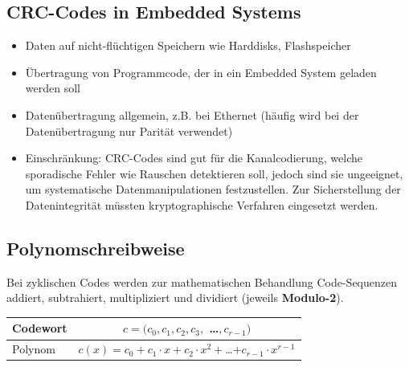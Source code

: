 \subsection{CRC-Codes in Embedded Systems}
\begin{itemize}
	\item Daten auf nicht-flüchtigen Speichern wie Harddisks, Flashspeicher
	\item Übertragung von Programmcode, der in ein Embedded System geladen werden soll
	\item Datenübertragung allgemein, z.B. bei Ethernet (häufig wird bei der Datenübertragung nur Parität verwendet)
	\item Einschränkung: CRC-Codes sind gut für die Kanalcodierung, welche sporadische Fehler wie Rauschen detektieren soll, jedoch sind sie ungeeignet, um systematische Datenmanipulationen festzustellen. Zur Sicherstellung der Datenintegrität müssten kryptographische Verfahren eingesetzt werden.
\end{itemize}

\subsection{Polynomschreibweise}
Bei zyklischen Codes werden zur mathematischen Behandlung Code-Sequenzen addiert, subtrahiert, multipliziert und dividiert (jeweils \textbf{Modulo-2}).\\

\begin{tabular}{|l|c|}
\hline Codewort  & $c = (c_0, c_1, c_2, c_3,$ \dots $, c_{r-1})$ \\
\hline Polynom &  $c(x) = c_0 + c_1 \cdot x + c_2 \cdot x^2 + $\dots$ + c_{r-1} \cdot x^{r-1}$\\
\hline
\end{tabular} \\ \\

